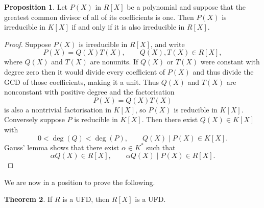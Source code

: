 \documentclass{article}
\newcommand{\rb}[1]{\left( #1 \right)}
\renewcommand{\sb}[1]{\left[ #1 \right]}
\theoremstyle{definition}\newtheorem{definition}{Definition}[subsection]
\theoremstyle{definition}\newtheorem{remark}[definition]{Remark}
\theoremstyle{definition}\newtheorem*{example}{Example}
\theoremstyle{definition}\newtheorem*{note}{Note}
\newtheorem{proposition}[definition]{Proposition}
\newtheorem{theorem}[definition]{Theorem}
\begin{document}
\begin{proposition}
Let $ P\rb{X} $ in $ R\sb{X} $ be a polynomial and suppose that the greatest common divisor of all of its coefficients is one. Then $ P\rb{X} $ is irreducible in $ K\sb{X} $ if and only if it is also irreducible in $ R\sb{X} $.
\end{proposition}

\begin{proof}
Suppose $ P\rb{X} $ is irreducible in $ R\sb{X} $, and write
$$ P\rb{X} = Q\rb{X}T\rb{X}, \qquad Q\rb{X}, T\rb{X} \in R\sb{X}, $$
where $ Q\rb{X} $ and $ T\rb{X} $ are nonunits. If $ Q\rb{X} $ or $ T\rb{X} $ were constant with degree zero then it would divide every coefficient of $ P\rb{X} $ and thus divide the GCD of those coefficients, making it a unit. Thus $ Q\rb{X} $ and $ T\rb{X} $ are nonconstant with positive degree and the factorisation
$$ P\rb{X} = Q\rb{X}T\rb{X} $$
is also a nontrivial factorisation in $ K\sb{X} $, so $ P\rb{X} $ is reducible in $ K\sb{X} $. Conversely suppose $ P $ is reducible in $ K\sb{X} $. Then there exist $ Q\rb{X} \in K\sb{X} $ with
$$ 0 < \deg\rb{Q} < \deg\rb{P}, \qquad Q\rb{X} \mid P\rb{X} \in K\sb{X}. $$
Gauss' lemma shows that there exist $ \alpha \in K^* $ such that
$$ \alpha Q\rb{X} \in R\sb{X}, \qquad \alpha Q\rb{X} \mid P\rb{X} \in R\sb{X}. $$
\end{proof}

We are now in a position to prove the following.

\begin{theorem}
If $ R $ is a UFD, then $ R\sb{X} $ is a UFD.
\end{theorem}
\end{document}
